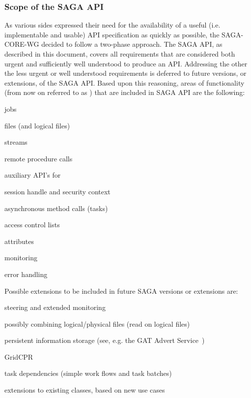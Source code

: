   \subsubsection*{Scope of the SAGA API}
  
  As various sides expressed their need for the availability of a
  useful (i.e. implementable and usable) API specification as quickly
  as possible, the SAGA-CORE-WG decided to follow a two-phase
  approach.  The SAGA API, as described in this document, covers all
  requirements that are considered both urgent and sufficiently well
  understood to produce an API.  Addressing the other the less
    urgent or well understood requirements is deferred to future
  versions, or extensions, of the SAGA API.  Based upon this
  reasoning, areas of functionality (from now on referred to as
  ) that are included in SAGA API are the following:

  \begin{shortlist}
   \item jobs
   \item files (and logical files)
   \item streams
   \item remote procedure calls~\cite{gridrpc}
   \item auxiliary API's for\\[-0.7em]
    \begin{shortlist}
      \item session handle and security context
      \item asynchronous method calls (tasks)
      \item access control lists
      \item attributes
      \item monitoring
      \item error handling
    \end{shortlist}
  \end{shortlist}


  Possible extensions to be included in future SAGA versions or
  extensions are:

  \begin{shortlist}
    \item steering and extended monitoring
    \item possibly combining logical/physical files (read on logical
          files)
    \item persistent information storage (see, e.g.  
          the GAT Advert Service~\cite{gat})
    \item GridCPR~\cite{gridcpr}
    \item task dependencies (simple work flows and task batches)
    \item extensions to existing classes, based on new use cases
  \end{shortlist}

